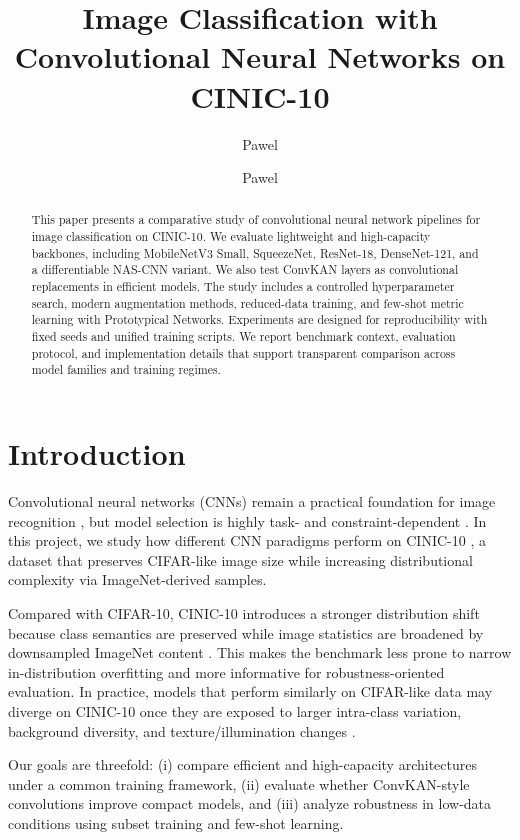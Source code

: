 \documentclass[cameraready]{Interspeech}
\title{Image Classification with Convolutional Neural Networks on CINIC-10}
\author[affiliation={1}]{Pawel}{Pozorski}
\author[affiliation={1}]{Pawel}{Florek}
\begin{document}
\maketitle

\begin{abstract}
This paper presents a comparative study of convolutional neural network pipelines for image classification on CINIC-10. We evaluate lightweight and high-capacity backbones, including MobileNetV3 Small, SqueezeNet, ResNet-18, DenseNet-121, and a differentiable NAS-CNN variant. We also test ConvKAN layers as convolutional replacements in efficient models. The study includes a controlled hyperparameter search, modern augmentation methods, reduced-data training, and few-shot metric learning with Prototypical Networks. Experiments are designed for reproducibility with fixed seeds and unified training scripts. We report benchmark context, evaluation protocol, and implementation details that support transparent comparison across model families and training regimes.
\end{abstract}

\section{Introduction}
Convolutional neural networks (CNNs) \cite{lecun1998gradient} remain a practical foundation for image recognition \cite{liu2022convnet}, but model selection is highly task- and constraint-dependent \cite{bianco2018benchmark, tan2019efficientnet}. In this project, we study how different CNN paradigms perform on CINIC-10 \cite{cinic}, a dataset that preserves CIFAR-like \cite{krizhevsky2009learning} image size while increasing distributional complexity via ImageNet-derived \cite{deng2009imagenet} samples.

Compared with CIFAR-10, CINIC-10 introduces a stronger distribution shift because class semantics are preserved while image statistics are broadened by downsampled ImageNet content \cite{cinic}. This makes the benchmark less prone to narrow in-distribution overfitting and more informative for robustness-oriented evaluation. In practice, models that perform similarly on CIFAR-like data may diverge on CINIC-10 once they are exposed to larger intra-class variation, background diversity, and texture/illumination changes \cite{cinic, recht2019do}.

Our goals are threefold: (i) compare efficient and high-capacity architectures under a common training framework, (ii) evaluate whether ConvKAN-style convolutions improve compact models, and (iii) analyze robustness in low-data conditions using subset training and few-shot learning.
\end{document}
